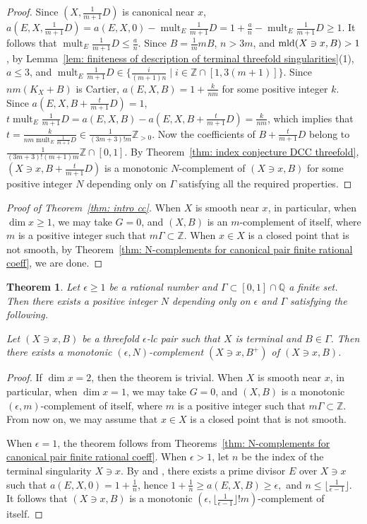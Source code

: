 \documentclass[11pt]{amsart}
\numberwithin{equation}{section}
\newcommand{\Qq}{\mathbb{Q}}
\newcommand{\Zz}{\mathbb{Z}}
\newcommand{\mld}{{\rm{mld}}}
\newcommand{\mult}{\operatorname{mult}}
\newcommand{\Ii}{{\Gamma}}
\newtheorem{thm}{Theorem}[section]
\theoremstyle{definition}
\theoremstyle{definition}
\begin{document}
\begin{proof}
Since $(X,\frac{1}{m+1}D)$ is canonical near $x$, $a(E,X,\frac{1}{m+1}D)=a(E,X,0)-\mult_E \frac{1}{m+1}D=1+\frac{a}{n}-\mult_E \frac{1}{m+1}D\geq 1$. It follows that $\mult_E \frac{1}{m+1}D\leq \frac{a}{n}$. Since $B=\frac{1}{m}mB$, $n>3m$, and $\mld(X\ni x, B)>1$, by Lemma~\ref{lem: finiteness of description of terminal threefold singularities}(1), $a\leq 3$, and $\mult_E \frac{1}{m+1}D\in\{\frac{i}{(m+1)n}\mid i\in\Zz\cap [1,3(m+1)]\}$. Since $nm(K_X+B)$ is Cartier, $a(E,X,B)=1+\frac{k}{nm}$ for some positive integer $k$. Since $a(E,X,B+\frac{t}{m+1}D)=1$, $t\mult_E \frac{1}{m+1}D=a(E,X,B)-a(E,X,B+\frac{t}{m+1}D)=\frac{k}{nm}$, which implies that $t=\frac{k}{nm\mult_E \frac{1}{m+1}D}\in \frac{1}{(3m+3)!m}\Zz_{>0}.$ Now the coefficients of $B+\frac{t}{m+1}D$ belong to $\frac{1}{(3m+3)!(m+1)m}\Zz\cap[0,1]$. By Theorem~\ref{thm: index conjecture DCC threefold}, $(X\ni x,B+\frac{t}{m+1}D)$ is a monotonic $N$-complement of $(X\ni x,B)$ for some positive integer $N$ depending only on $\Ii$ satisfying all the required properties.
\end{proof}

\begin{proof}[Proof of Theorem~\ref{thm: intro cc}]
When $X$ is smooth near $x$, in particular, when $\dim x\geq 1$, we may take $G=0$, and $(X,B)$ is an $m$-complement of itself, where $m$ is a positive integer such that $m\Ii\subset \Zz$. When $x\in X$ is a closed point that is not smooth, by Theorem~\ref{thm: N-complements for canonical pair finite rational coeff}, we are done.
\end{proof}


\begin{thm}\label{thm: epsilon-N-complements for canonical pair finite rational coeff}
Let $\epsilon\geq 1$ be a rational number and $\Gamma\subset [0,1]\cap \Qq$ a finite set. Then there exists a positive integer $N$ depending only on $\epsilon$ and $\Ii$ satisfying the following.

Let $(X\ni x,B)$ be a threefold $\epsilon$-lc pair such that  $X$ is terminal and $B\in \Ii$. Then there exists a monotonic $(\epsilon,N)$-complement $(X\ni x, B^+)$ of $(X\ni x, B)$.
\end{thm}

\begin{proof}
If $\dim x=2$, then the theorem is trivial. When $X$ is smooth near $x$, in particular, when $\dim x=1$, we may take $G=0$, and $(X,B)$ is a monotonic $(\epsilon,m)$-complement of itself, where $m$ is a positive integer such that $m\Ii\subset \Zz$. From now on, we may assume that $x\in X$ is a closed point that is not smooth. 

When $\epsilon=1$, the theorem follows from Theorems~\ref{thm: N-complements for canonical pair finite rational coeff}. When $\epsilon>1$, let $n$ be the index of the terminal singularity $X\ni x$. By \cite[Appendix, Theorem]{Sho92} and \cite[Theorem~0.1]{Mar96}, there exists a prime divisor $E$ over $X\ni x$ such that $a(E,X,0)=1+\frac{1}{n}$, hence $1+\frac{1}{n}\geq a(E,X,B)\geq \epsilon,$ and $n\leq \lfloor\frac{1}{\epsilon-1}\rfloor$. It follows that $(X\ni x, B)$ is a monotonic $(\epsilon,\lfloor\frac{1}{\epsilon-1}\rfloor!m)$-complement of itself.
\end{proof}
\end{document}
